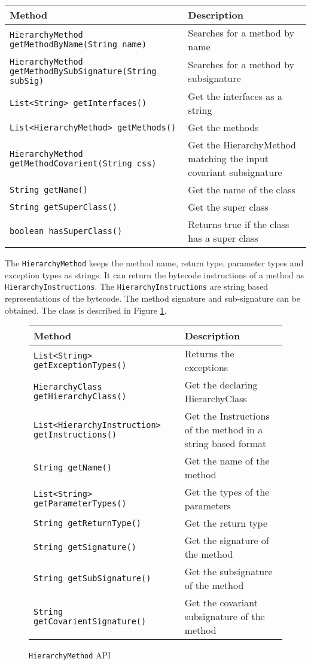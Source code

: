 \documentclass[preprint]{sigplanconf}
\begin{document}
\begin{figure*}[htbf]
\begin{tabularx}{\textwidth}{|XX|}
\hline
{\bf Method} & {\bf Description }\\\hline
{\tt HierarchyMethod getMethodByName(String name)} &  Searches for a 
    method by name\\\hline
{\tt HierarchyMethod getMethodBySubSignature(String subSig)} & 
    Searches for a method by subsignature\\\hline
{\tt List<String> getInterfaces()} & Get the interfaces as a string \\\hline
{\tt List<HierarchyMethod> getMethods()} & Get the methods\\\hline
{\tt HierarchyMethod getMethodCovarient(String css)} & Get the
    HierarchyMethod matching the input covariant subsignature\\\hline
{\tt String getName()} & Get the name of the class\\\hline
{\tt String getSuperClass()} & Get the super class\\\hline 
{\tt boolean hasSuperClass()} & Returns true if the class has a 
    super class\\\hline
\end{tabularx}
\caption{{\tt HierarchyClass} API}
\label{fig:rbhc}
\end{figure*}

The {\tt HierarchyMethod} keeps the method name, return type, parameter types and exception types as strings. It can return the bytecode instructions of a method as {\tt HierarchyInstructions}. The {\tt HierarchyInstructions} are string based representations of the bytecode. The method signature and sub-signature can be obtained. The class is described in Figure \ref{fig:rbhm}.

\begin{figure}[htbf]
\begin{tabularx}{\columnwidth}{|XX|}
\hline
{\bf Method} & {\bf Description }\\\hline
{\tt List<String> getExceptionTypes()} &  Returns the exceptions\\\hline 
{\tt HierarchyClass getHierarchyClass()} & Get
   the declaring HierarchyClass\\\hline 
{\tt List<HierarchyInstruction> getInstructions()} & Get the 
    Instructions of the method in a string based format\\\hline 
{\tt String getName()} & Get the name of the method\\\hline 
{\tt List<String> getParameterTypes()} & Get the types of the parameters\\\hline
{\tt String getReturnType()} & Get the return type\\\hline
{\tt String getSignature()} & Get the signature of the method\\\hline  
{\tt String getSubSignature()} & Get the subsignature of the method\\\hline
{\tt String getCovarientSignature()} & Get the covariant subsignature of the method\\\hline
\end{tabularx}
\caption{{\tt HierarchyMethod} API}
\label{fig:rbhm}
\end{figure}
\end{document}
